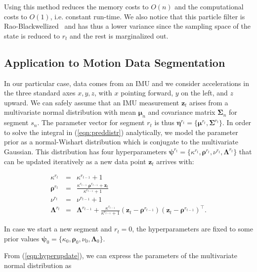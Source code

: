 Using this method reduces the memory costs to $O(n)$ and the computational costs
to $O(1)$, i.e. constant run-time. We also notice that this particle filter is
Rao-Blackwellized~\cite{casella96rao} and has thus a lower variance since the
sampling space of the state is reduced to $r_t$ and the rest is marginalized out.

\subsection{Application to Motion Data Segmentation}
In our particular case, data comes from an IMU and we consider accelerations in
the three standard axes $x,y,z$, with $x$ pointing forward, $y$ on the left, and
$z$ upward. We can safely assume that an IMU measurement $\mathbf{z}_t$ arises
from a multivariate normal distribution with mean $\boldsymbol{\mu}_n$ and
covariance matrix $\boldsymbol{\Sigma}_n$ for segment $s_n$. The parameter
vector for segment $r_t$ is thus $\boldsymbol{\eta}^{r_{t}}=
\{\boldsymbol{\mu}^{r_{t}},\boldsymbol{\Sigma}^{r_{t}}\}$. In order to solve
the integral in (\ref{eqn:preddistr}) analytically, we model the parameter prior
as a normal-Wishart distribution which is conjugate to the multivariate
Gaussian. This distribution has four hyperparameters
$\boldsymbol{\psi}^{r_{t}}=\{\kappa^{r_{t}},\boldsymbol{\rho}^{r_{t}},
\nu^{r_{t}},\boldsymbol{\Lambda}^{r_{t}}\}$ that can be updated iteratively
as a new data point $\mathbf{z}_t$ arrives with:

\begin{eqnarray}
\label{eqn:hyperupdate}
\kappa^{r_{t}}&=&\kappa^{r_{t-1}}+1\nonumber\\
\boldsymbol{\rho}^{r_{t}}&=&\frac{\kappa^{r_{t-1}}\;
\boldsymbol{\rho}^{r_{t-1}}+\mathbf{z}_t}{\kappa^{r_{t-1}}+1}\nonumber\\
\nu^{r_{t}}&=&\nu^{r_{t-1}}+1\nonumber\\
\boldsymbol{\Lambda}^{r_{t}}&=&\boldsymbol{\Lambda}^{r_{t-1}}+
\frac{\kappa^{r_{t-1}}}{\kappa^{r_{t-1}} + 1}
(\mathbf{z}_t - \boldsymbol{\rho}^{r_{t-1}})
(\mathbf{z}_t - \boldsymbol{\rho}^{r_{t-1}})^\intercal.
\end{eqnarray}

In case we start a new segment and $r_t=0$, the hyperparameters are fixed to
some prior values $\boldsymbol{\psi}_0=\{\kappa_0,\boldsymbol{\rho}_0,\nu_0,
\boldsymbol{\Lambda}_0\}$.

From (\ref{eqn:hyperupdate}), we can express the parameters of the
multivariate normal distribution as

